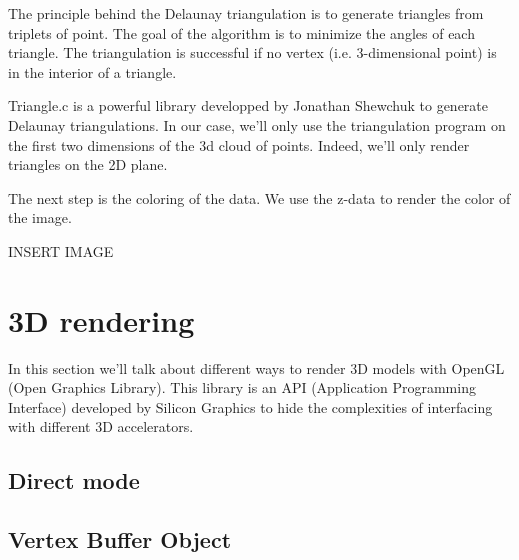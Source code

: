 The principle behind the Delaunay triangulation is to generate triangles from triplets of point. The goal of the algorithm is to minimize the angles of each triangle. The triangulation is successful if no vertex (i.e. 3-dimensional point) is in the interior of a triangle.

Triangle.c is a powerful library developped by Jonathan Shewchuk to generate Delaunay triangulations. In our case, we'll only use the triangulation program on the first two dimensions of the 3d cloud of points. Indeed, we'll only render triangles on the 2D plane.

The next step is the coloring of the data. We use the z-data to render the color of the image. 

INSERT IMAGE

\section{3D rendering}

In this section we'll talk about different ways to render 3D models with OpenGL (Open Graphics Library). This library is an API (Application Programming Interface) developed by Silicon Graphics to hide the complexities of interfacing with different 3D accelerators.




\subsection{Direct mode}

\subsection{Vertex Buffer Object}